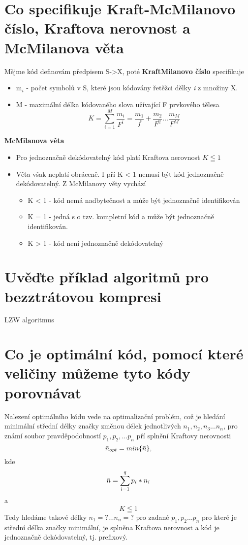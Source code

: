 \section{Co specifikuje Kraft-McMilanovo číslo, Kraftova nerovnost a McMilanova věta}
Mějme kód definovám předpisem S->X, poté \textbf{KraftMilanovo číslo} specifikuje
\begin{itemize}
    \item m$_i$ - počet symbolů v S, které jsou kódovány řetěžci dělky \emph{i} z množiny X.
    \item M - maximální délka kódovaného slova užívající F prvkového tělesa
    $$K = \sum_{i=1}^M \frac{m_i}{F^i}= \frac{m_1}{f} + \frac{m_2}{F^2} \dots \frac{m_M}{F^M}$$
\end{itemize}
\textbf{McMilanova věta}
\begin{itemize}
    \item Pro jednoznačně dekódovatelný kód platí Kraftova nerovnost $K \leqq 1$
    \item Věta však neplatí obráceně.
    I pří K < 1 nemusí být kód jednoznačně dekódovatelný.
    Z McMilanovy věty vychází
    \begin{itemize}
        \item K < 1 - kód nemá nadbytečnost a může být jednoznačně identifikován
        \item K = 1 - jedná s o tzv. kompletní kód a může být jednoznačně identifikován.
        \item K > 1 - kód není jednoznačně dekódovatelný
    \end{itemize}
\end{itemize}
\section{Uvěďte příklad algoritmů pro bezztrátovou kompresi}
LZW algoritmus

\section{Co je optimální kód, pomocí které veličiny můžeme tyto kódy porovnávat}
Nalezení optimálního kódu vede  na optimalizační problém, což je hledání minimální střední délky značky změnou délek jednotlivých $n_1, n_2, n_3 \dots n_n$, pro známí soubor pravděpodobností $p_1, p_2, \dots p_n$ pří splnění Kraftovy nerovnosti
$$\Bar{n}_{opt} = min \{\Bar{n}\},$$ kde
$$\Bar{n}=\sum_{i=1}^q p_i*n_i$$ a 
$$K\leqq1$$
Tedy hledáme takové délky $n_1=? \dots n_n=?$ pro zadané $p_1,p_2\dots p_n$ pro které je střední délka značky minimální, je splněna Kraftova nerovnost a kód je jednoznačně dekódovatelný, tj. prefixový.

